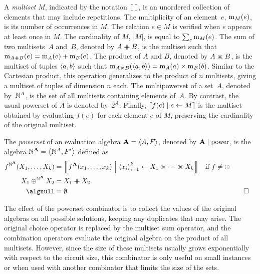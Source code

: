 \begin{definition}[Multisets]
    A \emph{multiset} \(M\), indicated by the notation \(\left[\mkern-2.5mu\left[\ \right]\mkern-2.5mu\right]\), is an unordered collection of elements that may include repetitions.
    The multiplicity of an element~\(e\), \(\operatorname{m}_M(e)\), is its number of occurrences in \(M\).
    The relation \(e \in M\) is verified when \(e\) appears at least once in \(M\).
    The cardinality of \(M\), \(|M|\), is equal to \(\sum_e \operatorname{m}_M(e)\).
    The sum of two multisets~\(A\) and~\(B\), denoted by \(A \mathbin{+\mkern-11.5mu+} B\), is the multiset such that \(\operatorname{m}_{A \mathbin{+\mkern-11.5mu+} B}(e) = \operatorname{m}_A(e) + \operatorname{m}_B(e)\).
    The product of \(A\) and \(B\), denoted by \(A \mathbin{\times\mkern-11.5mu\times} B\), is the multiset of tuples \(\left\langle a, b\right\rangle\) such that \(\operatorname{m}_{A \mathbin{\times\mkern-11.5mu\times} B}(\left\langle a, b\right\rangle) = \operatorname{m}_A(a) \times \operatorname{m}_B(b)\).
    Similar to the Cartesian product, this operation generalizes to the product of \(n\) multisets, giving a multiset of tuples of dimension \(n\) each.
    The multipowerset of a set~\(A\), denoted by~\(\mathbb{N}^A\), is the set of all multisets containing elements of~\(A\).
    By contrast, the usual powerset of \(A\) is denoted by~\(2^A\).
    Finally, \(\left[\mkern-2.5mu\left[f(e) \mid e \gets M\right]\mkern-2.5mu\right]\) is the multiset obtained by evaluating \(f(e)\) for each element \(e\) of \(M\), preserving the cardinality of the original multiset.
\end{definition}

\begin{definition}
    The \emph{powerset} of an evaluation algebra \(\mathbf{A} = \left\langle A, F\right\rangle\),
    denoted by \(\mathbf{A} \mid \mathrm{power}\),
    is the algebra \(\mathbb{N}^{\mathbf{A}} = \left\langle\mathbb{N}^A, F'\right\rangle\) defined as
    \begin{align*}
        f^{\nat^\alg}(X_1, \ldots, X_k) &= \bigmset{f^\alg(x_1, \ldots, x_k)\ \middle|\ \tup{x_i}_{i=1}^k \gets X_1 \mmul \cdots \mmul X_k}
            & \text{if } f \neq \oplus \\
        X_1 \algplus^{\nat^\alg} X_2 &= X_1 \madd X_2 \\
        \algnull &= \emptyset. && \qedhere
    \end{align*}
\end{definition}

The effect of the powerset combinator is to collect the values of the original algebras on all possible solutions, keeping any duplicates that may arise.
The original choice operator is replaced by the multiset sum operator, and the combination operators evaluate the original algebra on the product of all multisets.
However, since the size of these multisets usually grows exponentially with respect to the circuit size, this combinator is only useful on small instances or when used with another combinator that limits the size of the sets.

